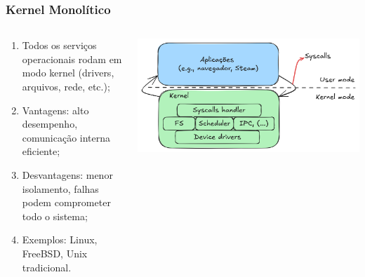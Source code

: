 \documentclass{beamer}
\begin{document}
\begin{frame}[fragile]
    \frametitle{Kernel Monolítico}

    \begin{columns}
        \begin{column}{0.4\textwidth}
            \begin{enumerate}\footnotesize
                \item Todos os serviços operacionais rodam em modo kernel (drivers, arquivos, rede, etc.);
                \item Vantagens: alto desempenho, comunicação interna eficiente;
                \item Desvantagens: menor isolamento, falhas podem comprometer todo o sistema;
                \item Exemplos: Linux, FreeBSD, Unix tradicional.
            \end{enumerate}
        \end{column}
        \begin{column}{0.6\textwidth}
            \begin{center}
                \includegraphics[width=\textwidth]{../figures/monolitico.png}
            \end{center}
        \end{column}
    \end{columns}
\end{frame}
\end{document}
